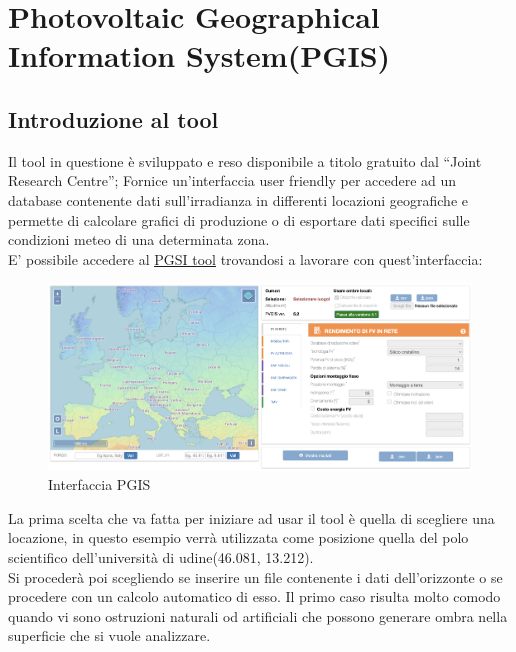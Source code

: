 
\chapter{Photovoltaic Geographical Information System(PGIS)}
\label{chp:Photovoltaic Geographical Information System(PGIS)}

\section{Introduzione al tool}
Il tool in questione è sviluppato e reso disponibile a titolo gratuito dal \enquote{Joint Research Centre}; Fornice un'interfaccia user friendly per accedere ad un database contenente dati sull'irradianza in differenti locazioni geografiche e permette di calcolare grafici di produzione o di esportare dati specifici sulle condizioni meteo di una determinata zona.\\
E' possibile accedere al \href{https://re.jrc.ec.europa.eu/pvg_tools/it/}{\underline{PGSI tool}} trovandosi a lavorare con quest'interfaccia:\\
\begin{figure}[H]
    \centering
    \includegraphics[height=0.5\textwidth]{res/cap 4/PGIS_schermata principale}
    \caption{Interfaccia PGIS}
\end{figure}\noindent
La prima scelta che va fatta per iniziare ad usar il tool è quella di scegliere una locazione, in questo esempio verrà utilizzata come posizione quella del polo scientifico dell'università di udine(46.081, 13.212).\\
Si procederà poi scegliendo se inserire un file contenente i dati dell'orizzonte o se procedere con un calcolo automatico di esso.
Il primo caso risulta molto comodo quando vi sono ostruzioni naturali od artificiali che possono generare ombra nella superficie che si vuole analizzare.\\
